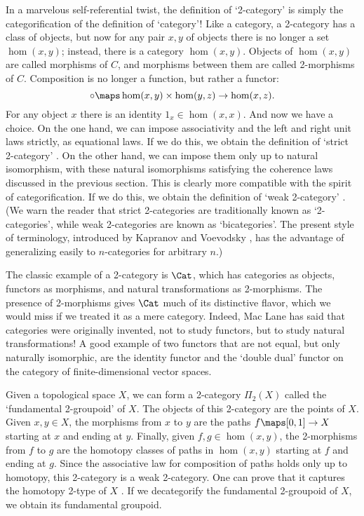 In a marvelous self-referential twist, the definition of `2-category' is
simply the categorification of the definition of `category'!   Like a
category, a 2-category has a class of objects, but now for any pair
$x,y$ of objects there is no longer a set $\hom(x,y)$; instead, there is
a category $\hom(x,y)$.  Objects of $\hom(x,y)$ are called morphisms of
$C$, and morphisms between them are called 2-morphisms of $C$. 
Composition is no longer a function, but rather a functor:
\[             \circ \maps \hom(x,y) \times \hom(y,z) \to \hom(x,z) .\]
For any object $x$ there is an identity $1_x \in \hom(x,x)$.  And now we
have a choice.  On the one hand, we can impose associativity and the
left and right unit laws strictly, as equational laws.  If we do this,
we obtain the definition of `strict 2-category' \cite{KS}.  On the other
hand, we can impose them only up to natural isomorphism, with these
natural isomorphisms satisfying the coherence laws discussed in the
previous section.  This is clearly more compatible with the spirit of
categorification.  If we do this, we obtain the definition of `weak
2-category' \cite{Benabou}.  (We warn the reader that strict
2-categories are traditionally known as `2-categories', while weak
2-categories are known as `bicategories'.  The present style of
terminology, introduced by Kapranov and Voevodsky \cite{KV}, has the
advantage of generalizing easily to $n$-categories for arbitrary $n$.)

The classic example of a 2-category is $\Cat$, which has categories as
objects, functors as morphisms, and natural transformations as
2-morphisms.   The presence of 2-morphisms gives $\Cat$ much of its
distinctive flavor, which we would miss if we treated it as a mere
category.  Indeed, Mac Lane has said that categories were originally
invented, not to study functors, but to study natural transformations! 
A good example of two functors that are not equal, but only naturally
isomorphic, are the identity functor and the `double dual' functor on
the category of finite-dimensional vector spaces.  

Given a topological space $X$, we can form a 2-category $\Pi_2(X)$
called the `fundamental 2-groupoid' of $X$.  The objects of this 
2-category are the points of $X$.   Given $x,y \in X$, the morphisms
from $x$ to $y$ are the paths $f \maps [0,1] \to X$ starting at $x$ and
ending at $y$.  Finally, given $f,g \in \hom(x,y)$, the 2-morphisms from
$f$ to $g$ are the homotopy classes of paths in $\hom(x,y)$ starting at
$f$ and ending at $g$.    Since the associative law for composition of
paths holds only up to homotopy, this 2-category is a weak 2-category. 
One can prove that it captures the homotopy 2-type of $X$ \cite{BS,MW}.
If we decategorify the fundamental 2-groupoid of $X$, we obtain its
fundamental groupoid.

